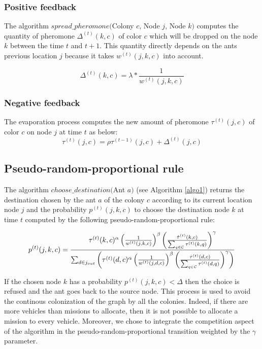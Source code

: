 \documentclass[review]{elsarticle}
\begin{document}
\subsubsection{Positive feedback}
The algorithm $spread\_pheromone($Colony $c$, Node $j$, Node $k)$ computes the quantity of pheromone $\Delta^{(t)}(k,c)$ of color $c$  which will be dropped on the node $k$ between the time $t$ and $t+1$. This quantity directly depends on the ants previous location $j$ because it takes $w^{(t)}(j,k,c)$ into account.

\begin{equation*}
 \Delta^{(t)}(k,c) = \lambda * \frac{1}{w^{(t)}(j,k,c)}
\end{equation*}

\subsubsection{Negative feedback}
The evaporation process computes the new amount of pheromone $\tau^{(t)}(j,c)$ of color $c$ on node $j$ at time $t$ as below:
\begin{equation*}
 \tau^{(t)}(j,c) = \rho \tau^{(t-1)}(j,c) + \Delta^{(t)}(j,c)
\end{equation*}

\subsection{Pseudo-random-proportional rule}
The algorithm $choose\_destination($Ant $a)$ (see Algorithm \ref{algo1}) returns the destination chosen by the ant $a$ of the colony $c$ according to its current location node $j$ and the probability $p^{(t)}(j,k,c)$ to choose the destination node $k$ at time $t$ computed by the following pseudo-random-proportional rule:

\begin{equation*}
  p^{(t)}(j,k,c) = \frac
    {
      \tau^{(t)}(k,c)^{\alpha}
      \left( \frac{1}{w^{(t)}(j,k,c)} \right) ^{\beta}
      \left( \frac{\hat \tau^{(t)}(k,c)}{\sum_{q \in \cal{C}} \tau^{(t)}(k,q)} \right)^{\gamma}
    }
    {
      \sum_{d \in j_{out}} \left(
	\tau^{(t)}(d,c)^{\alpha}
	\left( \frac{1}{w^{(t)}(j,d,c)} \right)^{\beta}
	\left( \frac{\hat \tau^{(t)}(d,c)}{\sum_{q \in \cal{C}} \tau^{(t)}(d,q)} \right)^{\gamma}
      \right)
    }
\end{equation*}

If the chosen node $k$ has a probability $p^{(t)}(j,k,c) < \Delta$ then the choice is refused and the ant goes back to the source node. This process is used to avoid the continous colonization of the graph by all the colonies. Indeed, if there are more vehicles than missions to allocate, then it is not possible to allocate a mission to every vehicle. Moreover, we chose to integrate the competition aspect of the algorithm in the pseudo-random-proportional transition weighted by the $\gamma$ parameter.
\end{document}
